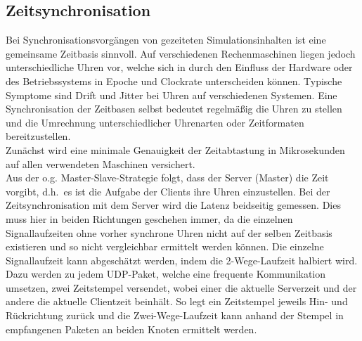 \subsection{Zeitsynchronisation}

Bei Synchronisationsvorgängen von gezeiteten Simulationsinhalten ist eine gemeinsame Zeitbasis sinnvoll.
Auf verschiedenen Rechenmaschinen liegen jedoch unterschiedliche Uhren vor, welche sich
in durch den Einfluss der Hardware oder des Betriebssystems in Epoche und Clockrate unterscheiden können. Typische Symptome sind Drift und Jitter bei Uhren auf verschiedenen Systemen.
Eine Synchronisation der Zeitbasen selbst bedeutet regelmäßig die Uhren zu stellen und die Umrechnung
unterschiedlicher Uhrenarten oder Zeitformaten bereitzustellen.\\
Zunächst wird eine minimale Genauigkeit der Zeitabtastung in Mikrosekunden auf allen verwendeten Maschinen versichert.\\
Aus der o.g. Master-Slave-Strategie folgt, dass der Server (Master) die Zeit vorgibt, d.h.~es ist die Aufgabe der Clients ihre Uhren einzustellen. 
Bei der Zeitsynchronisation mit dem Server wird die Latenz beidseitig gemessen.
Dies muss hier in beiden Richtungen geschehen immer, da die einzelnen Signallaufzeiten ohne vorher synchrone Uhren nicht auf der selben Zeitbasis existieren und so nicht vergleichbar ermittelt werden können. 
Die einzelne Signallaufzeit kann abgeschätzt werden, indem die 2-Wege-Laufzeit halbiert wird. Dazu werden zu jedem UDP-Paket, welche eine frequente Kommunikation umsetzen, zwei Zeitstempel versendet, wobei einer die aktuelle Serverzeit und der andere die aktuelle Clientzeit beinhält.
So legt ein Zeitstempel jeweils Hin- und Rückrichtung zurück und die Zwei-Wege-Laufzeit kann anhand der Stempel in empfangenen Paketen an beiden Knoten ermittelt werden.

